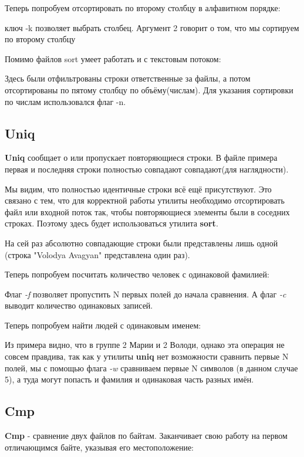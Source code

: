 \documentclass[a4paper]{article}
\begin{document}
Теперь попробуем отсортировать по второму столбцу в алфавитном порядке:

ключ -k позволяет выбрать столбец. Аргумент 2 говорит о том, что мы сортируем по второму столбцу

Помимо файлов sort умеет работать и с текстовым потоком:

Здесь были отфильтрованы строки ответственные за файлы, а потом отсортированы по пятому столбцу по объёму(числам). Для указания сортировки по числам использовался флаг -n.
\subsection{Uniq} 
\textbf{Uniq} сообщает о или пропускает повторяющиеся строки. В файле примера первая и последняя строки полностью совпадают совпадают(для наглядности).



Мы видим, что полностью идентичные строки всё ещё присутствуют. Это связано с тем, что для корректной работы утилиты необходимо отсортировать файл или входной поток так, чтобы повторяющиеся элементы были в соседних строках. Поэтому здесь будет использоваться утилита \textbf{sort}.



На сей раз абсолютно совпадающие строки были представлены лишь одной (строка "Volodya Avagyan" представлена один раз).

Теперь попробуем посчитать количество человек с одинаковой фамилией:



Флаг \textit{-f} позволяет пропустить N первых полей до начала сравнения. А флаг \textit{-c} выводит количество одинаковых записей.

Теперь попробуем найти людей с одинаковым именем:



Из примера видно, что в группе 2 Марии и 2 Володи, однако эта операция не совсем правдива, так как у утилиты \textbf{uniq} нет возможности сравнить первые N полей, мы с помощью флага \textit{-w} сравниваем первые N символов (в данном случае 5), а туда могут попасть и фамилия и одинаковая часть разных имён.
\subsection{Cmp}
\textbf{Cmp} - сравнение двух файлов по байтам. Заканчивает свою работу на первом отличающимся байте, указывая его местоположение:

\end{document}
